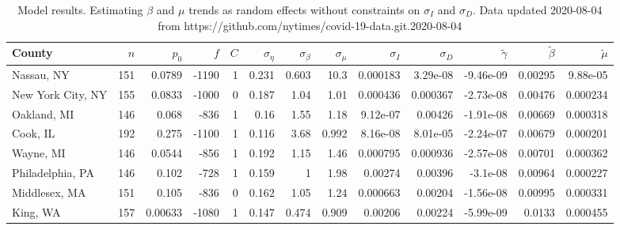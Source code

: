 \documentclass[12pt,letterpaper]{article}
\begin{document}
\begin{appendices}
\begin{sidewaystable}
{%
}\end{sidewaystable}
\clearpage


\begin{sidewaystable}
\caption{\label{tab:uncons}
Model results. Estimating $\beta$ and $\mu$ trends as random effects
without constraints on  $\sigma_I$ and $\sigma_D$. 
Data updated 2020-08-04 from https://github.com/nytimes/covid-19-data.git.2020-08-04
}
\centering
{\scriptsize

\begin{tabular}{lrrrrrrrrrrrr}
\hline
 County             &   $n$ &   $p_0$ &   $f$ &   $C$ &   $\sigma_\eta$ &   $\sigma_\beta$ &   $\sigma_\mu$ &   $\sigma_I$ &   $\sigma_D$ &   $\tilde\gamma$ &   $\tilde{\beta}$ &   $\tilde{\mu}$ \\
\hline
 Nassau, NY         & 151   & 0.0789  & -1190 &     1 &           0.231 &            0.603 &         10.3   &    0.000183  &     3.29e-08 &        -9.46e-09 &           0.00295 &       9.88e-05  \\
 New York City, NY  & 155   & 0.0833  & -1000 &     0 &           0.187 &            1.04  &          1.01  &    0.000436  &     0.000367 &        -2.73e-08 &           0.00476 &       0.000234  \\
 Oakland, MI        & 146   & 0.068   &  -836 &     1 &           0.16  &            1.55  &          1.18  &    9.12e-07  &     0.00426  &        -1.91e-08 &           0.00669 &       0.000318  \\
 Cook, IL           & 192   & 0.275   & -1100 &     1 &           0.116 &            3.68  &          0.992 &    8.16e-08  &     8.01e-05 &        -2.24e-07 &           0.00679 &       0.000201  \\
 Wayne, MI          & 146   & 0.0544  &  -856 &     1 &           0.192 &            1.15  &          1.46  &    0.000795  &     0.000936 &        -2.57e-08 &           0.00701 &       0.000362  \\
 Philadelphia, PA   & 146   & 0.102   &  -728 &     1 &           0.159 &            1     &          1.98  &    0.00274   &     0.00396  &        -3.1e-08  &           0.00964 &       0.000227  \\
 Middlesex, MA      & 151   & 0.105   &  -836 &     0 &           0.162 &            1.05  &          1.24  &    0.000663  &     0.00204  &        -1.56e-08 &           0.00995 &       0.000331  \\
 King, WA           & 157   & 0.00633 & -1080 &     1 &           0.147 &            0.474 &          0.909 &    0.00206   &     0.00224  &        -5.99e-09 &           0.0133  &       0.000455  \\

\end{tabular}}
\end{sidewaystable}
\end{appendices}
\end{document}
